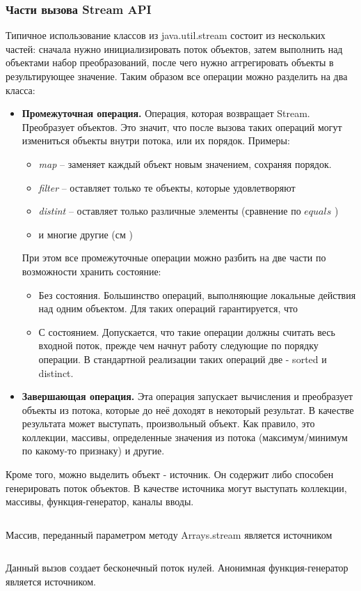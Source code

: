 \subsubsection{Части вызова Stream API}
Типичное использование классов из java.util.stream состоит из нескольких частей: сначала 
нужно инициализировать поток объектов, затем выполнить над объектами набор преобразований, 
после чего нужно аггрегировать объекты в результирующее значение. Таким образом все операции 
можно разделить на два класса:
\begin{itemize}
	\item \textbf{Промежуточная операция.} Операция, которая возвращает Stream. Преобразует объектов. Это значит, что после вызова таких 
	операций могут измениться объекты внутри потока, или их порядок. Примеры:
	\begin{itemize}
		\item \textit{map} -- заменяет каждый объект новым значением, сохраняя порядок.
		\item \textit{filter} -- оставляет только те объекты, которые удовлетворяют 
		\item \textit{distint} -- оставляет только различные элементы (сравнение по $equals$ \cite{java:equals})
		\item и многие другие (см \cite{java:stream})
	\end{itemize}
	При этом все промежуточные операции можно разбить на две части по возможности хранить состояние:
	\begin{itemize}
		\item Без состояния. Большинство операций, выполняющие локальные действия над одним 
		объектом. Для таких операций гарантируется, что 
		\item С состоянием. Допускается, что такие операции должны считать весь входной 
		поток, прежде чем начнут работу следующие по порядку операции. В стандартной 
		реализации таких операций две - sorted и distinct.
	\end{itemize}
	\item \textbf{Завершающая операция.} Эта операция запускает вычисления и преобразует 
	объекты из потока, которые до неё доходят в некоторый результат. В качестве результата 
	может выступать, произвольный объект. Как правило, это коллекции, массивы, определенные 
	значения из потока (максимум/минимум по какому-то признаку) и другие.
\end{itemize}

Кроме того, можно выделить объект - источник. Он содержит либо способен генерировать поток объектов. В качестве источника могут выступать коллекции, массивы, функция-генератор, каналы вводы.
\inputminted{java}{chapter1/code/IntStream.java}
Массив, переданный параметром методу Arrays.stream является источником
\inputminted{java}{chapter1/code/ZerosStream.java}
Данный вызов создает бесконечный поток нулей. Анонимная функция-генератор является источником.

